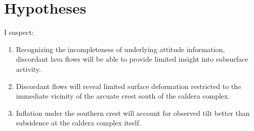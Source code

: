 \section{Hypotheses}

I suspect:
\begin{enumerate}
    \item Recognizing the incompleteness of underlying attitude information, discordant lava flows will be able to provide limited insight into subsurface activity.
    \item Discordant flows will reveal limited surface deformation restricted to the immediate vicinity of the arcuate crest south of the caldera complex.
    \item Inflation under the southern crest will account for observed tilt better than subsidence at the caldera complex itself. 
\end{enumerate}


